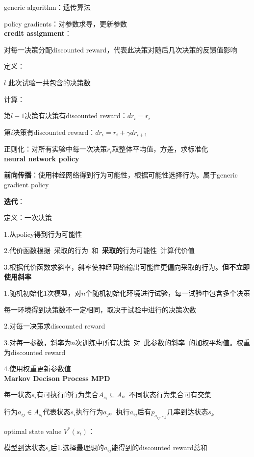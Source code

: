 \documentclass[UTF8]{ctexart}
\begin{document}
  generic algorithm：遗传算法

  policy gradients：对参数求导，更新参数\\
\textbf{credit assignment}：

  对每一决策分配discounted reward，代表此决策对随后几次决策的反馈值影响

  定义：

  \quad $l$ 此次试验一共包含的决策数

  计算：

  \quad 第$l-1$决策有决策有discounted reward：$dr_i = r_i$
  
  \quad 第$i$决策有discounted reward：$dr_i = r_i + \gamma dr_{i+1}$
  
  \quad 正则化：对所有实验中每一次决策$r_i$取整体平均值，方差，求标准化\\
\textbf{neural network policy}

  \textbf{前向传播}：使用神经网络得到行为可能性，根据可能性选择行为。属于generic gradient policy

  \textbf{迭代}：

  \quad 定义：一次决策

  \quad \quad 1.从policy得到行为可能性

  \quad \quad 2.代价函数根据\ 采取的行为\ 和\ \textbf{采取的}行为可能性\ 计算代价值

  \quad \quad 3.根据代价函数求斜率，斜率使神经网络输出可能性更偏向采取的行为。\textbf{但不立即使用斜率}

  \quad 1.随机初始化1次模型，对$n$个随机初始化环境进行试验，每一试验中包含多个决策
  
  \quad \quad 每一环境得到决策数不一定相同，取决于试验中进行的决策次数

  \quad 2.对每一决策求discounted reward
  
  \quad 3.对每一参数，斜率为$n$次训练中所有决策\ 对\ 此参数的斜率\ 的加权平均值。权重为discounted reward

  \quad 4.使用权重更新参数值\\
\textbf{Markov Decison Process MPD}

  每一状态$s_i$有可执行的行为集合$A_{s_i} \subseteq A$。不同状态行为集合可有交集

  行为$a_{ij} \in A_{s_i}$代表状态$s_i$执行行为$a_j$。执行$a_{ij}$后有$p_{a_{ij}, s_k}$几率到达状态$s_k$

  optimal state value $V^*(s_i)$：
  
  \quad 模型到达状态$s_i$后1.选择最理想的$a_{ij}$能得到的discounted reward总和
\end{document}

